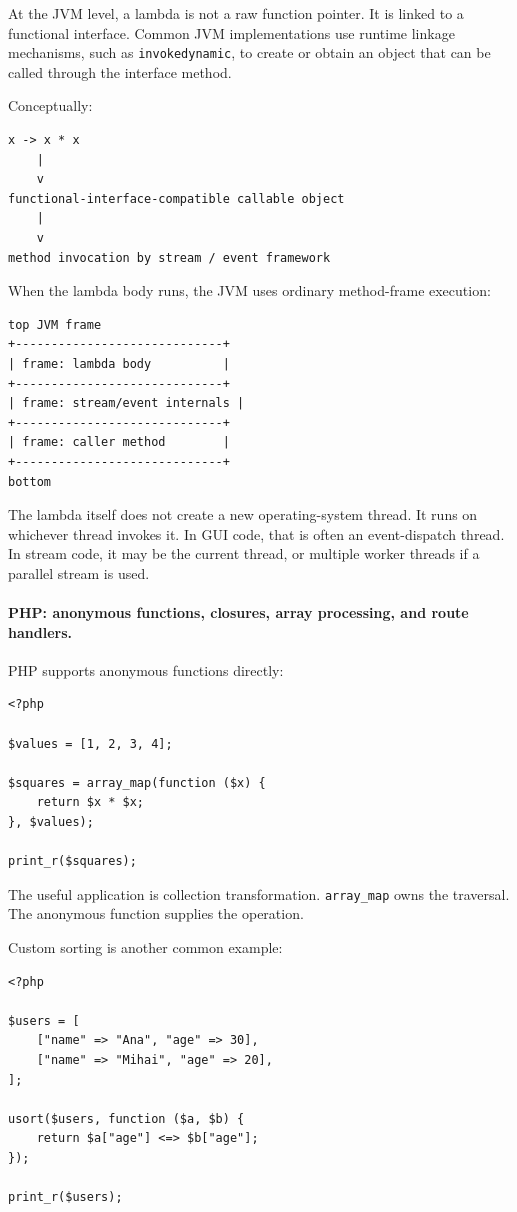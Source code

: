 At the JVM level, a lambda is not a raw function pointer. It is linked to a functional interface. Common JVM implementations use runtime linkage mechanisms, such as \texttt{invokedynamic}, to create or obtain an object that can be called through the interface method.

Conceptually:

\begin{verbatim}
x -> x * x
    |
    v
functional-interface-compatible callable object
    |
    v
method invocation by stream / event framework
\end{verbatim}

When the lambda body runs, the JVM uses ordinary method-frame execution:

\begin{verbatim}
top JVM frame
+-----------------------------+
| frame: lambda body          |
+-----------------------------+
| frame: stream/event internals |
+-----------------------------+
| frame: caller method        |
+-----------------------------+
bottom
\end{verbatim}

The lambda itself does not create a new operating-system thread. It runs on whichever thread invokes it. In GUI code, that is often an event-dispatch thread. In stream code, it may be the current thread, or multiple worker threads if a parallel stream is used.

\paragraph{PHP: anonymous functions, closures, array processing, and route handlers.}

PHP supports anonymous functions directly:

\begin{verbatim}
<?php

$values = [1, 2, 3, 4];

$squares = array_map(function ($x) {
    return $x * $x;
}, $values);

print_r($squares);
\end{verbatim}

The useful application is collection transformation. \texttt{array\_map} owns the traversal. The anonymous function supplies the operation.

Custom sorting is another common example:

\begin{verbatim}
<?php

$users = [
    ["name" => "Ana", "age" => 30],
    ["name" => "Mihai", "age" => 20],
];

usort($users, function ($a, $b) {
    return $a["age"] <=> $b["age"];
});

print_r($users);
\end{verbatim}

